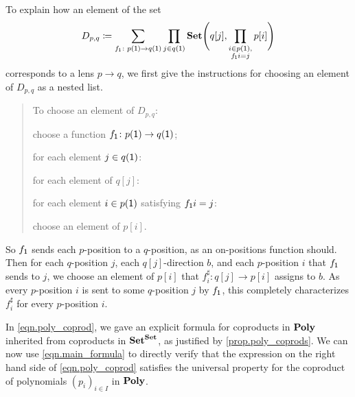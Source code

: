 \documentclass[Book-Poly]{subfiles}
\begin{document}
\begin{exercise}
\begin{solution}
\begin{longenum}
\item To explain how an element of the set
\[
	D_{p,q} \coloneqq \sum_{f_{\textsf{1}}\colon p(\textsf{1})\to q(\textsf{1})}\prod_{j\in q(\textsf{1})}\mathbf{Set}\Bigg(q[j],\prod_{\substack{i \in p(\textsf{1}), \\ f_{\textsf{1}}i = j}}p[i]\Bigg)
\]
corresponds to a lens $p\to q$, we first give the instructions for choosing an element of $D_{p,q}$ as a nested list.
\begin{quote}
To choose an element of $D_{p,q}$:
\begin{longenum}
    \item choose a function $f_{\textsf{1}} \colon p(\textsf{1}) \to q(\textsf{1})$;
    \item for each element $j \in q(\textsf{1})$:
    \begin{longenum}
        \item for each element of $q[j]$:
        \begin{longenum}
            \item for each element $i \in p(\textsf{1})$ satisfying $f_{\textsf{1}}i = j$:
            \begin{longenum}
                \item choose an element of $p[i]$.
            \end{longenum}
        \end{longenum}
    \end{longenum}
\end{longenum}
\end{quote}
So $f_{\textsf{1}}$ sends each $p$-position to a $q$-position, as an on-positions function should.
Then for each $q$-position $j$, each $q[j]$-direction $b$, and each $p$-position $i$ that $f_{\textsf{1}}$ sends to $j$, we choose an element of $p[i]$ that $f^\sharp_i\colon q[j]\to p[i]$ assigns to $b$.
As every $p$-position $i$ is sent to some $q$-position $j$ by $f_{\textsf{1}}$, this completely characterizes $f^\sharp_i$ for every $p$-position $i$.
\end{longenum}
\end{solution}
\end{exercise}

In \eqref{eqn.poly_coprod}, we gave an explicit formula for coproducts in $\mathbf{Poly}$ inherited from coproducts in $\mathbf{Set}^{\mathbf{Set}}$, as justified by \cref{prop.poly_coprods}.
We can now use \eqref{eqn.main_formula} to directly verify that the expression on the right hand side of \eqref{eqn.poly_coprod} satisfies the universal property for the coproduct of polynomials $(p_i)_{i\in I}$ in $\mathbf{Poly}$.
\end{document}
